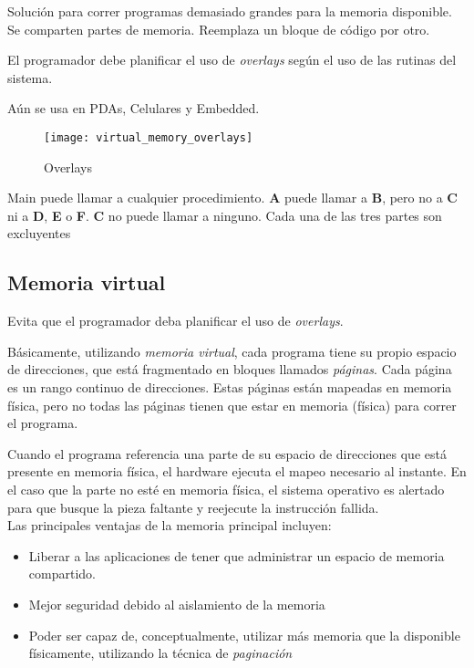 \documentclass[a4paper, twoside]{article}
\begin{document}
Solución para correr programas demasiado grandes para la memoria disponible.
Se comparten partes de memoria.
Reemplaza un bloque de código por otro.

El programador debe planificar el uso de \emph{overlays} según el uso de las
rutinas del sistema.

Aún se usa en PDAs, Celulares y Embedded.

\begin{figure}[h]
  \centering
  \texttt{[image: virtual\_memory\_overlays]}
  \caption{Overlays}
  \label{fig:virtual_memory_overlays}
\end{figure}

Main puede llamar a cualquier procedimiento.
\textbf{A} puede llamar a \textbf{B}, pero no a \textbf{C} ni a \textbf{D},
\textbf{E} o \textbf{F}. \textbf{C} no puede llamar a ninguno.
Cada una de las tres partes son excluyentes

\subsection{Memoria virtual}

Evita que el programador deba planificar el uso de \emph{overlays}.

Básicamente, utilizando \emph{memoria virtual}, cada programa tiene su propio
espacio de direcciones, que está fragmentado en bloques llamados
\emph{páginas}. Cada página es un rango continuo de direcciones.
Estas páginas están mapeadas en memoria física, pero no todas las páginas
tienen que estar en memoria (física) para correr el programa.

Cuando el programa referencia una parte de su espacio de direcciones que está
presente en memoria física, el hardware ejecuta el mapeo necesario al instante.
En el caso que la parte no esté en memoria física, el sistema operativo es
alertado para que busque la pieza faltante y reejecute la instrucción fallida.\\

Las principales ventajas de la memoria principal incluyen:
\begin{itemize}
  \item Liberar a las aplicaciones de tener que administrar un espacio de
  memoria compartido.
  \item Mejor seguridad debido al aislamiento de la memoria
  \item Poder ser capaz de, conceptualmente, utilizar más memoria que la
  disponible físicamente, utilizando la técnica de \emph{paginación}
\end{itemize}
\end{document}
